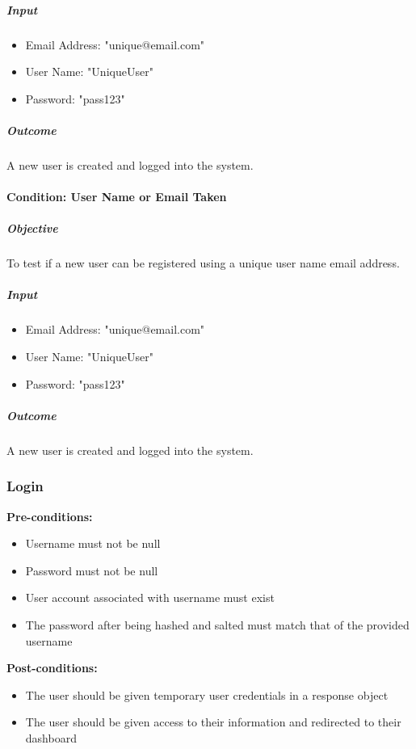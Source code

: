 \documentclass{article}
\begin{document}
				\subparagraph{Input}
				\begin{itemize}
					\item Email Address: "unique@email.com"
					\item User Name: "UniqueUser"
					\item Password: "pass123"
				\end{itemize}
				
				\subparagraph{Outcome}
					A new user is created and logged into the system.
					
			\paragraph{Condition: User Name or Email Taken}
				\subparagraph{Objective}
					To test if a new user can be registered using a unique user name email address.
				
				\subparagraph{Input}
					\begin{itemize}
						\item Email Address: "unique@email.com"
						\item User Name: "UniqueUser"
						\item Password: "pass123"
					\end{itemize}
				
				\subparagraph{Outcome}
					A new user is created and logged into the system.
		
		\subsubsection{Login}
			\textbf{Pre-conditions:}
				\begin{itemize}
					\item Username must not be null
					\item Password must not be null
					\item User account associated with username must exist
					\item The password after being hashed and salted must match that of the provided username
				\end{itemize}
			\textbf{Post-conditions:}
				\begin{itemize}
					\item The user should be given temporary user credentials in a response object
					\item The user should be given access to their information and redirected to their dashboard
				\end{itemize}
			
\end{document}
